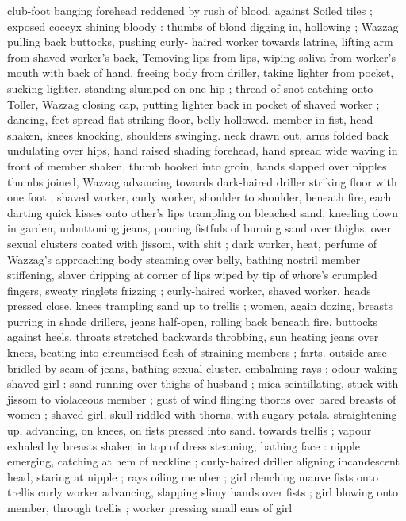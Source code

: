 {club-foot banging forehead reddened by rush of blood, against 
Soiled tiles ; exposed coccyx shining bloody : thumbs of blond 
digging in, hollowing ; Wazzag pulling back buttocks, pushing curly- 
haired worker towards latrine, lifting arm from shaved worker's back, 
Temoving lips from lips, wiping saliva from worker's mouth with back 
of hand. freeing body from driller, taking lighter from pocket, sucking 
lighter. standing slumped on one hip ; thread of snot catching onto 
Toller, Wazzag closing cap, putting lighter back in pocket of shaved 
worker ; dancing, feet spread flat striking floor, belly hollowed. 
member in fist, head shaken, knees knocking, shoulders swinging. 
neck drawn out, arms folded back undulating over hips, hand raised 
shading forehead, hand spread wide waving in front of member 
shaken, thumb hooked into groin, hands slapped over nipples 
thumbs joined, Wazzag advancing towards dark-haired driller striking 
floor with one foot ; shaved worker, curly worker, shoulder to 
shoulder, beneath fire, each darting quick kisses onto other's lips 
trampling on bleached sand, kneeling down in garden, unbuttoning 
jeans, pouring fistfuls of burning sand over thighs, over sexual 
clusters coated with jissom, with shit ; dark worker, heat, perfume of 
Wazzag's approaching body steaming over belly, bathing nostril 
member stiffening, slaver dripping at corner of lips wiped by tip of 
whore's crumpled fingers, sweaty ringlets frizzing ; curly-haired 
worker, shaved worker, heads pressed close, knees trampling sand 
up to trellis ; women, again dozing, breasts purring in shade 
drillers, jeans half-open, rolling back beneath fire, buttocks against 
heels, throats stretched backwards throbbing, sun heating jeans over 
knees, beating into circumcised flesh of straining members ; farts. 
outside arse bridled by seam of jeans, bathing sexual cluster. 
embalming rays ; odour waking shaved girl : sand running over 
thighs of husband ; mica scintillating, stuck with jissom to violaceous 
member ; gust of wind flinging thorns over bared breasts of women 
; shaved girl, skull riddled with thorns, with sugary petals. 
straightening up, advancing, on knees, on fists pressed into sand. 
towards trellis ; vapour exhaled by breasts shaken in top of dress 
steaming, bathing face : nipple emerging, catching at hem of 
neckline ; curly-haired driller aligning incandescent head, staring at 
nipple ; rays oiling member ; girl clenching mauve fists onto trellis 
curly worker advancing, slapping slimy hands over fists ; girl blowing 
onto member, through trellis ; worker pressing small ears of girl 
}
